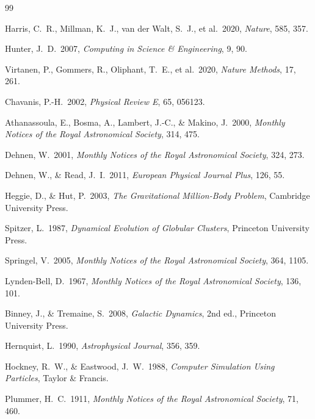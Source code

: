 \documentclass[twocolumn,linenumbers]{aastex701}
\begin{document}
\begin{thebibliography}{99}

Harris, C.~R., Millman, K.~J., van der Walt, S.~J., et al.\ 2020,
\textit{Nature}, 585, 357.

Hunter, J.~D.\ 2007, \textit{Computing in Science \& Engineering}, 9, 90.

Virtanen, P., Gommers, R., Oliphant, T.~E., et al.\ 2020,
\textit{Nature Methods}, 17, 261.

Chavanis, P.-H.\ 2002, \textit{Physical Review E}, 65, 056123.

Athanassoula, E., Bosma, A., Lambert, J.-C., \& Makino, J.\ 2000,
\textit{Monthly Notices of the Royal Astronomical Society}, 314, 475.

Dehnen, W.\ 2001,
\textit{Monthly Notices of the Royal Astronomical Society}, 324, 273.

Dehnen, W., \& Read, J.~I.\ 2011,
\textit{European Physical Journal Plus}, 126, 55.

Heggie, D., \& Hut, P.\ 2003,
\textit{The Gravitational Million-Body Problem},
Cambridge University Press.

Spitzer, L.\ 1987,
\textit{Dynamical Evolution of Globular Clusters},
Princeton University Press.

Springel, V.\ 2005,
\textit{Monthly Notices of the Royal Astronomical Society}, 364, 1105.

Lynden-Bell, D.\ 1967,
\textit{Monthly Notices of the Royal Astronomical Society}, 136, 101.

Binney, J., \& Tremaine, S.\ 2008, \textit{Galactic Dynamics}, 2nd ed.,
Princeton University Press.

Hernquist, L.\ 1990, \textit{Astrophysical Journal}, 356, 359.

Hockney, R.~W., \& Eastwood, J.~W.\ 1988,
\textit{Computer Simulation Using Particles}, Taylor \& Francis.

Plummer, H.~C.\ 1911,
\textit{Monthly Notices of the Royal Astronomical Society}, 71, 460.


\end{thebibliography}
\end{document}
